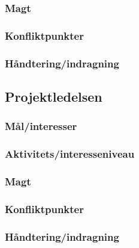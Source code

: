 \documentclass[10pt,a4paper,danish]{article}
\begin{document}
\subsubsection{Magt}

\subsubsection{Konfliktpunkter}

\subsubsection{Håndtering/indragning}

\subsection{Projektledelsen}
\subsubsection{Mål/interesser}

\subsubsection{Aktivitets/interesseniveau}

\subsubsection{Magt}

\subsubsection{Konfliktpunkter}

\subsubsection{Håndtering/indragning}
\end{document}
